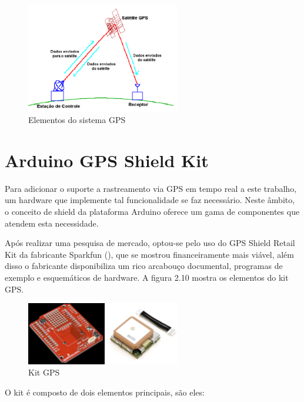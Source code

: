 \begin{figure}[h!]
			\centering
			\includegraphics[width=0.6\textwidth]{figures/elemGPS.png}
			\caption{Elementos do sistema GPS}
			\label{1}
\end{figure}

\section{Arduino GPS Shield Kit}

Para adicionar o suporte a rastreamento via GPS em tempo real a este trabalho, um hardware que implemente tal funcionalidade se faz necessário. Neste âmbito, o conceito de shield da plataforma Arduino oferece um gama de componentes que atendem esta necessidade.

Após realizar uma pesquisa de mercado, optou-se pelo uso do GPS Shield Retail Kit da fabricante Sparkfun (\textcite{gpsshield:2013}), que se mostrou financeiramente mais viável, além disso o fabricante disponibiliza um rico arcabouço documental, programas de exemplo e esquemáticos de hardware. A figura 2.10 mostra os elementos do kit GPS.

\begin{figure}[h!]
			\centering
			\includegraphics[width=0.6\textwidth]{figures/6_gps.png}
			\caption{Kit GPS}
			\label{1}
\end{figure}

O kit é composto de dois elementos principais, são eles:

